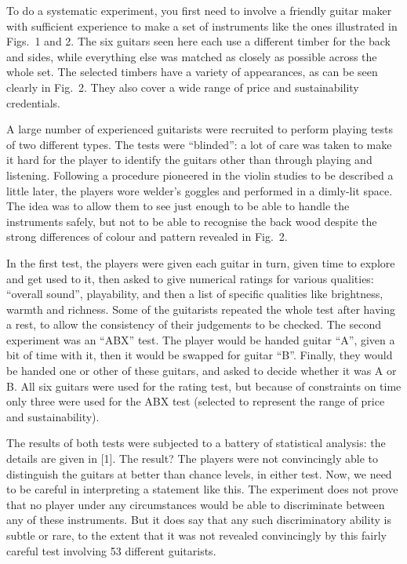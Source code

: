   To do a systematic experiment, you first need to involve a friendly guitar 
  maker with sufficient experience to make a set of instruments like the ones 
  illustrated in Figs.\ 1 and 2. The six guitars seen here each use a different 
  timber for the back and sides, while everything else was matched as closely 
  as possible across the whole set. The selected timbers have a variety of 
  appearances, as can be seen clearly in Fig.\ 2. They also cover a wide range 
  of price and sustainability credentials. 

  A large number of experienced guitarists were recruited to perform playing 
  tests of two different types. The tests were “blinded”: a lot of care was 
  taken to make it hard for the player to identify the guitars other than 
  through playing and listening. Following a procedure pioneered in the violin 
  studies to be described a little later, the players wore welder’s goggles and 
  performed in a dimly-lit space. The idea was to allow them to see just enough 
  to be able to handle the instruments safely, but not to be able to recognise 
  the back wood despite the strong differences of colour and pattern revealed 
  in Fig.\ 2. 

  In the first test, the players were given each guitar in turn, given time to 
  explore and get used to it, then asked to give numerical ratings for various 
  qualities: “overall sound”, playability, and then a list of specific 
  qualities like brightness, warmth and richness. Some of the guitarists 
  repeated the whole test after having a rest, to allow the consistency of 
  their judgements to be checked. The second experiment was an “ABX” test. The 
  player would be handed guitar “A”, given a bit of time with it, then it would 
  be swapped for guitar “B”. Finally, they would be handed one or other of 
  these guitars, and asked to decide whether it was A or B. All six guitars 
  were used for the rating test, but because of constraints on time only three 
  were used for the ABX test (selected to represent the range of price and 
  sustainability). 

  The results of both tests were subjected to a battery of statistical 
  analysis: the details are given in [1]. The result? The players were not 
  convincingly able to distinguish the guitars at better than chance levels, in 
  either test. Now, we need to be careful in interpreting a statement like 
  this. The experiment does not prove that no player under any circumstances 
  would be able to discriminate between any of these instruments. But it does 
  say that any such discriminatory ability is subtle or rare, to the extent 
  that it was not revealed convincingly by this fairly careful test involving 
  53 different guitarists. 

